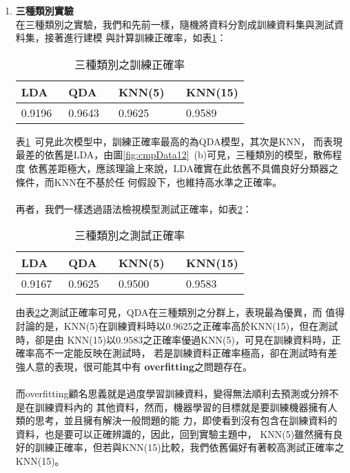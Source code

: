 \begin{enumerate}
{		}
		\item {\textbf{三種類別實驗}\\
			在三種類別之實驗，我們和先前一樣，隨機將資料分割成訓練資料集與測試資料集，接著進行建模				與計算訓練正確率，如表\ref{table:c3trainAcc}：
			\bigskip			
			\begin{table}[h]				
				\caption{三種類別之訓練正確率}\label{table:c3trainAcc}
				\centering
				\extrarowheight=8pt
				\begin{tabular}{p{2.5cm} p{2.5cm} p{2.5cm} p{2cm} } 					
				\hline
				LDA\    &QDA \    &KNN(5) \ &KNN(15) \\ \hline	
				0.9196\ & 0.9643\ & 0.9625\ & 0.9589 \\
				\hline					
				\end{tabular}
			\end{table}
			\bigskip
			表\ref{table:c3trainAcc}\ 可見此次模型中，訓練正確率最高的為QDA模型，其次是KNN，				而表現最差的依舊是LDA，由圖\ref{fig:cmpData12}\ (b)可見，三種類別的模型，散佈程度				依舊差距極大，應該理論上來說，LDA確實在此依舊不具備良好分類器之條件，而KNN在不基於任				何假設下，也維持高水準之正確率。\\
			\\
			再者，我們一樣透過語法檢視模型測試正確率，如表\ref{table:c3testAcc}：
			\bigskip			
			\begin{table}[h]				
				\caption{三種類別之測試正確率}\label{table:c3testAcc}
				\centering
				\extrarowheight=8pt
				\begin{tabular}{p{2.5cm} p{2.5cm} p{2.5cm} p{2cm} } 					
				\hline
				LDA\    &QDA \    &KNN(5) \ &KNN(15) \\ \hline	
				0.9167\ & 0.9625\ & 0.9500\ & 0.9583 \\
				\hline					
				\end{tabular}
			\end{table}
			\bigskip
			由表\ref{table:c3testAcc}之測試正確率可見，QDA在三種類別之分群上，表現最為優異，而				值得討論的是，KNN(5)在訓練資料時以0.9625之正確率高於KNN(15)，但在測試時，卻是由					KNN(15)以0.9583之正確率優過KNN(5)，可見在訓練資料時，正確率高不一定能反映在測試時，				若是訓練資料正確率極高，卻在測試時有差強人意的表現，很可能其中有									\textbf{overfitting}之問題存在。\\
			\\
			而overfitting顧名思義就是過度學習訓練資料，變得無法順利去預測或分辨不是在訓練資料內的				其他資料，然而，機器學習的目標就是要訓練機器擁有人類的思考，並且擁有解決一般問題的能				力，即使看到沒有包含在訓練資料的資料，也是要可以正確辨識的，因此，回到實驗主題中，					KNN(5)雖然擁有良好的訓練正確率，但若與KNN(15)比較，我們依舊偏好有著較高測試正確率之				KNN(15)。
				
		}
		\end{enumerate}
